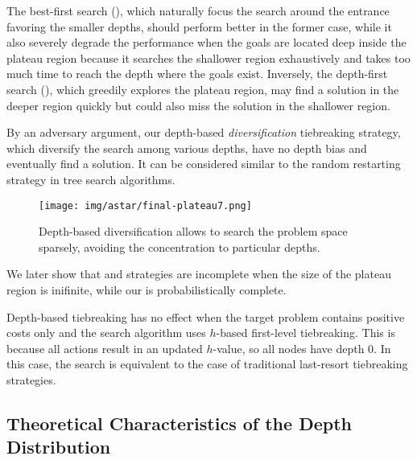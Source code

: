 


The best-first search (\fifo), which naturally focus the search around
the entrance favoring the smaller depths, should perform better in the
former case, while it also severely degrade the performance when the
goals are located deep inside the plateau region because it searches the
shallower region exhaustively and takes too much time to reach the depth
where the goals exist.
Inversely, the depth-first search (\lifo), which greedily explores the
plateau region, may find a solution in the deeper region quickly but
could also miss the solution in the shallower region.

By an adversary argument, our depth-based \emph{diversification}
tiebreaking strategy, which diversify the search among various depths,
have no depth bias and eventually find a solution. It can be considered
similar to the random restarting strategy in tree search algorithms.

\begin{figure}[htbp]
 \texttt{[image: img/astar/final-plateau7.png]}
 \caption{Depth-based diversification allows to search the problem space
 sparsely, avoiding the concentration to particular depths.}
 \label{fig:plateau-depiction-all-optimal}
\end{figure}


We later show that
\fifo and \lifo strategies are incomplete when the size of the plateau
region is inifinite, while our \id is probabilistically complete.

Depth-based tiebreaking has no effect when the target problem contains
positive costs only and the search algorithm uses $h$-based first-level
tiebreaking.  This is because all actions result in an updated
$h$-value, so all nodes have depth 0. In this case, the search is
equivalent to the case of traditional last-resort tiebreaking strategies.



\subsection{Theoretical Characteristics of the Depth Distribution}

